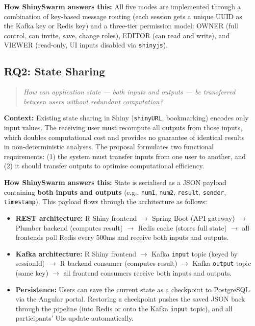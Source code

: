\documentclass[12pt,a4paper]{article}
\begin{document}
\textbf{How ShinySwarm answers this:} All five modes are implemented through a combination of key-based message routing (each session gets a unique UUID as the Kafka key or Redis key) and a three-tier permission model: OWNER (full control, can invite, save, change roles), EDITOR (can read and write), and VIEWER (read-only, UI inputs disabled via \texttt{shinyjs}).

\subsection{RQ2: State Sharing}

\begin{quote}
\textit{How can application state --- both inputs and outputs --- be transferred between users without redundant computation?}
\end{quote}

\textbf{Context:} Existing state sharing in Shiny (\texttt{shinyURL}, bookmarking) encodes only input values. The receiving user must recompute all outputs from those inputs, which doubles computational cost and provides no guarantee of identical results in non-deterministic analyses. The proposal formulates two functional requirements: (1) the system must transfer inputs from one user to another, and (2) it should transfer outputs to optimise computational efficiency.

\textbf{How ShinySwarm answers this:} State is serialised as a JSON payload containing \textbf{both inputs and outputs} (e.g., \texttt{num1}, \texttt{num2}, \texttt{result}, \texttt{sender}, \texttt{timestamp}). This payload flows through the architecture as follows:

\begin{itemize}[nosep]
  \item \textbf{REST architecture:} R Shiny frontend $\rightarrow$ Spring Boot (API gateway) $\rightarrow$ Plumber backend (computes result) $\rightarrow$ Redis cache (stores full state) $\rightarrow$ all frontends poll Redis every 500ms and receive both inputs and outputs.
  \item \textbf{Kafka architecture:} R Shiny frontend $\rightarrow$ Kafka \texttt{input} topic (keyed by sessionId) $\rightarrow$ R backend consumer (computes result) $\rightarrow$ Kafka \texttt{output} topic (same key) $\rightarrow$ all frontend consumers receive both inputs and outputs.
  \item \textbf{Persistence:} Users can save the current state as a checkpoint to PostgreSQL via the Angular portal. Restoring a checkpoint pushes the saved JSON back through the pipeline (into Redis or onto the Kafka \texttt{input} topic), and all participants' UIs update automatically.
\end{itemize}
\end{document}
